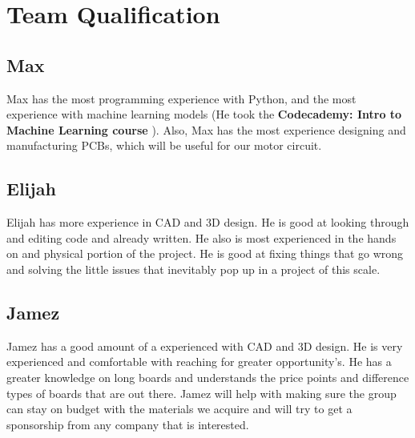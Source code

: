 \documentclass{article}
\begin{document}
\section{Team Qualification}
\subsection{Max}
Max has the most programming experience with Python, and the most experience with machine learning models (He took the \textbf{Codecademy: Intro to Machine Learning course} \cite{codecademy}). Also, Max has the most experience designing and manufacturing PCBs, which will be useful for our motor circuit.
\subsection{Elijah}
Elijah has more experience in CAD and 3D design. He is good at looking through and editing code and already written. He also is most experienced in the hands on and physical portion of the project. He is good at fixing things that go wrong and solving the little issues that inevitably pop up in a project of this scale.
\subsection{Jamez}
Jamez has a good amount of a experienced with CAD and 3D design. He is very experienced and comfortable with reaching for greater opportunity's. He has a greater knowledge on long boards and understands the price points and difference types of boards that are out there. Jamez will help with making sure the group can stay on budget with the materials we acquire and will try to get a sponsorship from any company that is interested.



\end{document}
